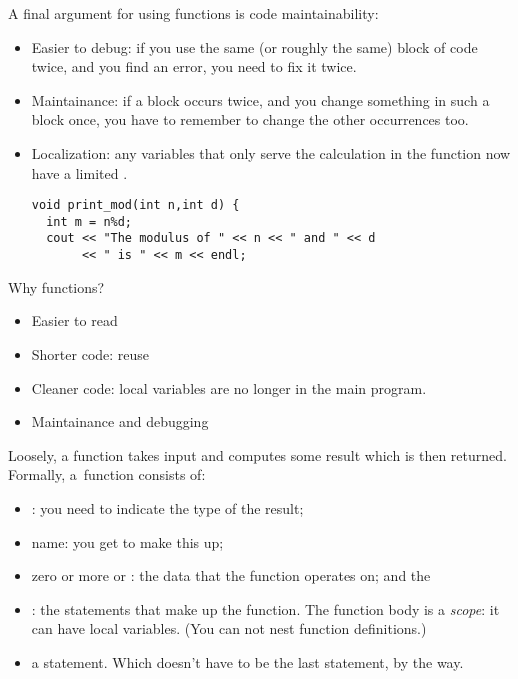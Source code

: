 A final argument for using functions is code maintainability:
\begin{itemize}
\item Easier to debug: if you use the same (or roughly the same) block
  of code twice, and you find an error, you need to fix it twice.
\item Maintainance: if a block occurs twice, and  you change something in such a block
  once, you have to remember to change the other occurrences too.
\item Localization: any variables that only serve the calculation in
  the function now have a limited .
\begin{verbatim}
void print_mod(int n,int d) {
  int m = n%d;
  cout << "The modulus of " << n << " and " << d 
       << " is " << m << endl;
\end{verbatim}
\end{itemize}

\begin{slide}{Why functions?}
  \label{sl:func-why}
  \begin{itemize}
  \item Easier to read
  \item Shorter code: reuse
  \item Cleaner code: local variables are no longer in the main program.
  \item Maintainance and debugging
  \end{itemize}
\end{slide}

Loosely, a function takes input and computes some result which is then returned.
Formally, a~function consists of:
\begin{itemize}
\item {}: you need to indicate
  the type of the result;
\item name: you get to make this up;
\item zero or more  or
  : the data that the function
  operates on; and the
\item {}: the statements that make up
  the function. The function body is a \emph{scope}: it can have local
  variables. (You can not nest function definitions.)
\item a  statement. Which doesn't have to be
  the last statement, by the way.
\end{itemize}

